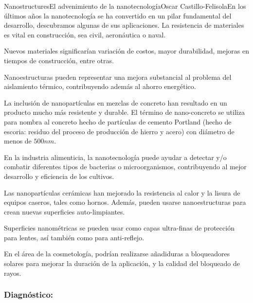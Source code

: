 \begin{article}{Nanostructures}{El advenimiento de la nanotecnolog\'ia}{Oscar Castillo-Felisola}{En los \'ultimos a\~nos la nanotecnolog\'ia se ha convertido en un pilar fundamental del desarrollo, descubramos algunas de sus aplicaciones.}
La resistencia de materiales es vital en construcci\'on, sea civil, aeron\'autica o naval. 

Nuevos materiales significar\'ian variaci\'on de costos, mayor durabilidad, mejoras en tiempos de construcci\'on, entre otras.

Nanoestructuras pueden representar una mejora substancial al problema del aislamiento t\'ermico, contribuyendo adem\'as al ahorro energ\'etico.

La inclusi\'on de nanopart\'iculas en mezclas de concreto han resultado en un producto mucho m\'as resistente y durable. El t\'ermino de nano-concreto se utiliza para nombra al concreto hecho de part\'iculas de cemento Portland (hecho de escoria: residuo del proceso de producci\'on de hierro y acero) con di\'ametro de menos de $500 n m$.


En la industria alimenticia, la nanotecnolog\'ia puede ayudar a detectar y/o combatir diferentes tipos de bacterias o microorganismos, contribuyendo al mejor desarrollo y eficiencia de los cultivos.

Las nanopart\'iculas cer\'amicas han mejorado la resistencia al calor y la lisura de equipos caseros, tales como hornos. Adem\'as, pueden usarse nanoestructuras para crean nuevas superficies auto-limpiantes.

Superficies nanom\'etricas se pueden usar como capas ultra-finas de protecci\'on para lentes, as\'i tambi\'en como para anti-reflejo.

En el \'area de la cosmetolog\'ia, podr\'ian realizarse a\~nadiduras a bloqueadores solares para mejorar la duraci\'on de la aplicaci\'on, y la calidad del bloqueado de rayos.





\subsubsection*{Diagn\'ostico:}


\end{article}
